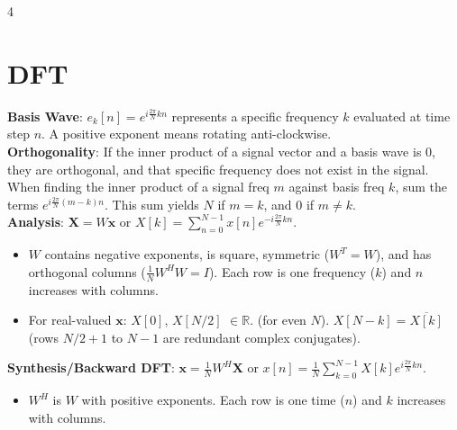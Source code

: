 \documentclass[9pt]{extarticle}
\begin{document}
\begin{multicols*}{4}
\section*{DFT}
\textbf{Basis Wave}: $e_{k}[n]=e^{i\frac{2\pi}{N}kn}$ represents a specific frequency $k$ evaluated at time step $n$. A positive exponent means rotating anti-clockwise.\\
\textbf{Orthogonality}: If the inner product of a signal vector and a basis wave is 0, they are orthogonal, and that specific frequency does not exist in the signal.\\
When finding the inner product of a signal freq $m$ against basis freq $k$, sum the terms $e^{i\frac{2\pi}{N}(m-k)n}$. This sum yields $N$ if $m=k$, and $0$ if $m \ne k$.\\
\textbf{Analysis}: $\mathbf{X}=W\mathbf{x}$ or $X[k]=\sum_{n=0}^{N-1}x[n]e^{-i\frac{2\pi}{N}kn}$.
\begin{itemize}
    \item $W$ contains negative exponents, is square, symmetric ($W^{T}=W$), and has orthogonal columns ($\frac{1}{N}W^{H}W=I$). Each row is one frequency ($k$) and $n$ increases with columns.
    \item For real-valued $\mathbf{x}$: $X[0]$, $X[N/2]$ $\in \mathbb{R}$. (for even $N$). $X[N-k]=\overline{X[k]}$ (rows $N/2+1$ to $N-1$ are redundant complex conjugates).
\end{itemize}
\noindent
{}
\textbf{Synthesis/Backward DFT}: $\mathbf{x}=\frac{1}{N}W^{H}\mathbf{X}$ or $x[n]=\frac{1}{N}\sum_{k=0}^{N-1}X[k]e^{i\frac{2\pi}{N}kn}$.
\begin{itemize}
    \item $W^{H}$ is $W$ with positive exponents. Each row is one time ($n$) and $k$ increases with columns.
\end{itemize}

\end{multicols*}
\end{document}

